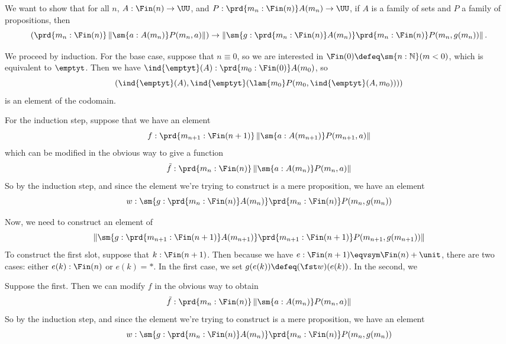  \soln
We want to show that for all $n$, $A : \Fin(n) \to \UU$, and 
$P : \prd{m_{n} : \Fin(n)} A(m_{n}) \to \UU$, if $A$ is a family of sets and
$P$ a family of propositions, then
\[
  \left(
    \prd{m_{n} : \Fin(n)} \left\lVert \sm{a:A(m_{n})} P(m_{n}, a)\right\rVert
  \right)
  \to
  \left\lVert
    \sm{g : \prd{m_{n} : \Fin(n)} A(m_{n})} \prd{m_{n} : \Fin(n)}
        P(m_{n}, g(m_{n}))
  \right\rVert.
\]


We proceed by induction.  For the base case, suppose that $n \equiv 0$, so we
are interested in $\Fin(0) \defeq \sm{n:\mathbb{N}}(m < 0)$, which is
equivalent to $\emptyt$.  Then we have $\ind{\emptyt}(A) : \prd{m_{0} :
\Fin(0)} A(m_{0})$, so
\[
  \left(
    \ind{\emptyt}(A),
    \ind{\emptyt}(\lam{m_{0}}P(m_{0}, \ind{\emptyt}(A, m_{0})))
  \right)
\]
is an element of the codomain.


For the induction step, suppose that we have an element
\[
  f : \prd{m_{n+1} : \Fin(n+1)} 
        \left\lVert \sm{a:A(m_{n+1})} P(m_{n+1}, a)\right\rVert
\]
which can be modified in the obvious way to give a function
\[
  \tilde{f} : \prd{m_{n} : \Fin(n)} 
        \left\lVert \sm{a:A(m_{n})} P(m_{n}, a)\right\rVert
\]
So by the induction step, and since the element we're trying to construct is a
mere proposition, we have an element
\[
    w : \sm{g : \prd{m_{n} : \Fin(n)} A(m_{n})} \prd{m_{n} : \Fin(n)}
        P(m_{n}, g(m_{n}))
\]


Now, we need to construct an element of
\[
\left\lVert
    \sm{g : \prd{m_{n+1} : \Fin(n+1)} A(m_{n+1})} \prd{m_{n+1} : \Fin(n+1)}
        P(m_{n+1}, g(m_{n+1}))
\right\rVert
\]
To construct the first slot, suppose that $k : \Fin(n + 1)$.  Then because we
have $e : \Fin(n+1) \eqvsym \Fin(n) + \unit$, there are two cases: either $e(k)
: \Fin(n)$ or $e(k) = *$.  In the first case, we set $g(e(k)) \defeq (\fst
w)(e(k))$.  In the second, we 


Suppose the first.  Then we can modify $f$ in the
obvious way to obtain
\[
  \tilde{f} : \prd{m_{n} : \Fin(n)} 
        \left\lVert \sm{a:A(m_{n})} P(m_{n}, a)\right\rVert
\]
So by the induction step, and since the element we're trying to construct is a
mere proposition, we have an element
\[
    w : \sm{g : \prd{m_{n} : \Fin(n)} A(m_{n})} \prd{m_{n} : \Fin(n)}
        P(m_{n}, g(m_{n}))
\]


